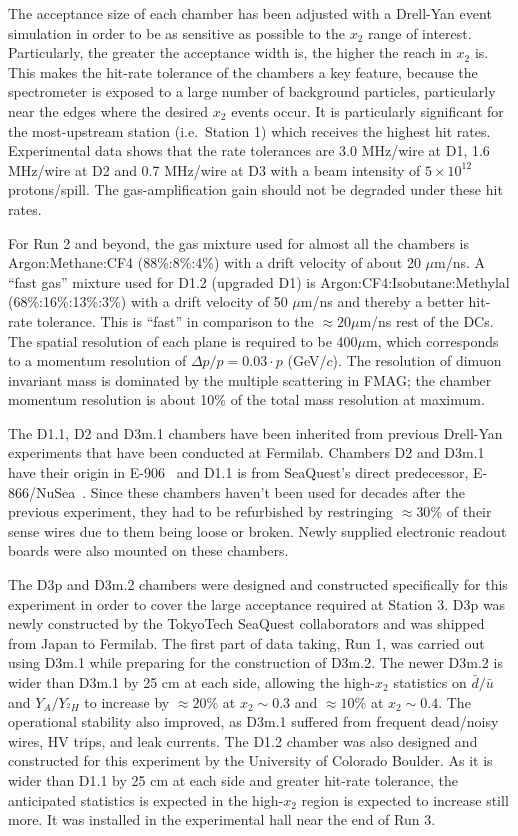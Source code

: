 The acceptance size of each chamber has been adjusted with a Drell-Yan event simulation in order to be as sensitive as possible to the $x_2$ range of interest. Particularly, the greater the acceptance width is, the higher the reach in $x_2$ is. This makes the hit-rate tolerance of the chambers a key feature, because the spectrometer is exposed to a large number of background particles, particularly near the edges where the desired $x_2$ events occur. It is particularly significant for the most-upstream station (i.e.~Station 1) which receives the highest hit rates. Experimental data shows that the rate tolerances are 3.0 MHz/wire at D1, 1.6 MHz/wire at D2 and 0.7 MHz/wire at D3 with a beam intensity of $5\times 10^{12}$ protons/spill. The gas-amplification gain should not be degraded under these hit rates.

For Run 2 and beyond, the gas mixture used for almost all the chambers is Argon:Methane:CF4 (88\%:8\%:4\%) with a drift velocity of about 20 $\mu$m/ns. A ``fast gas'' mixture used for D1.2 (upgraded D1) is Argon:CF4:Isobutane:Methylal (68\%:16\%:13\%:3\%) with a drift velocity of 50 $\mu$m/ns and thereby a better hit-rate tolerance. This is ``fast'' in comparison to the $\approx 20\mu$m/ns rest of the DCs. The spatial resolution of each plane is required to be 400$\mu$m, which corresponds to a momentum resolution of $\Delta p / p = 0.03 \cdot p$ (GeV/$c$). The resolution of dimuon invariant mass is dominated by the multiple scattering in FMAG; the chamber momentum resolution is about 10\% of the total mass resolution at maximum.

The D1.1, D2 and D3m.1 chambers have been inherited from previous Drell-Yan experiments that have been conducted at Fermilab.
Chambers D2 and D3m.1 have their origin in E-906~\cite{PhysRevD.43.2815} and D1.1 is from SeaQuest's direct predecessor, E-866/NuSea~\cite{PhysRevLett.80.3715, Towell:2001nh}. Since these chambers haven't been used for decades after the previous experiment, they had to be refurbished by restringing $\approx 30\%$ of their sense wires due to them being loose or broken. Newly supplied electronic readout boards were also mounted on these chambers.

The D3p and D3m.2 chambers were designed and constructed specifically for this experiment in order to cover the large acceptance required at Station 3. D3p was newly constructed by the TokyoTech SeaQuest collaborators and was shipped from Japan to Fermilab. The first part of data taking, Run 1, was carried out using D3m.1 while preparing for the construction of D3m.2. The newer D3m.2 is wider than D3m.1 by 25 cm at each side, allowing the high-$x_2$ statistics on $\bar{d}/\bar{u}$ and $Y_A / Y_{^2H}$ to increase by $\approx 20\%$ at $x_2 \sim 0.3$ and $\approx 10\%$ at $x_2 \sim 0.4$. The operational stability also improved, as D3m.1 suffered from frequent dead/noisy wires, HV trips, and leak currents. The D1.2 chamber was also designed and constructed for this experiment by the University of Colorado Boulder. As it is wider than D1.1 by 25 cm at each side and greater hit-rate tolerance, the anticipated statistics is expected in the high-$x_2$ region is expected to increase still more. It was installed in the experimental hall near the end of Run 3.

